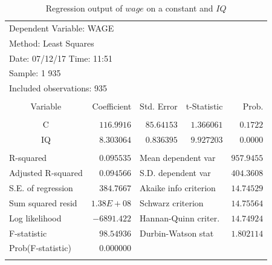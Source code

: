 \documentclass[12pt]{report}
\begin{document}
\begin{table}[H]
	\centering
	\begin{tabular}{lrrrr}
		\multicolumn{3}{l}{Dependent Variable: WAGE}&\multicolumn{1}{c}{}&\multicolumn{1}{c}{}\\
		\multicolumn{3}{l}{Method: Least Squares}&\multicolumn{1}{c}{}&\multicolumn{1}{c}{}\\
		\multicolumn{3}{l}{Date: 07/12/17   Time: 11:51}&\multicolumn{1}{c}{}&\multicolumn{1}{c}{}\\
		\multicolumn{2}{l}{Sample: 1 935}&\multicolumn{1}{c}{}&\multicolumn{1}{c}{}&\multicolumn{1}{c}{}\\
		\multicolumn{3}{l}{Included observations: 935}&\multicolumn{1}{c}{}&\multicolumn{1}{c}{}\\
		[4.5pt] \hline \\ [-4.5pt]
		\multicolumn{1}{c}{Variable}&\multicolumn{1}{r}{Coefficient}&\multicolumn{1}{r}{Std. Error}&\multicolumn{1}{r}{t-Statistic}&\multicolumn{1}{r}{Prob.}\\
		[4.5pt] \hline \\ [-4.5pt]
		\multicolumn{1}{c}{C}&\multicolumn{1}{r}{$116.9916$}&\multicolumn{1}{r}{$85.64153$}&\multicolumn{1}{r}{$1.366061$}&\multicolumn{1}{r}{$0.1722$}\\
		\multicolumn{1}{c}{IQ}&\multicolumn{1}{r}{$8.303064$}&\multicolumn{1}{r}{$0.836395$}&\multicolumn{1}{r}{$9.927203$}&\multicolumn{1}{r}{$0.0000$}\\
		[4.5pt] \hline \\ [-4.5pt]
		\multicolumn{1}{l}{R-squared}&\multicolumn{1}{r}{$0.095535$}&\multicolumn{2}{l}{Mean dependent var}&\multicolumn{1}{r}{$957.9455$}\\
		\multicolumn{1}{l}{Adjusted R-squared}&\multicolumn{1}{r}{$0.094566$}&\multicolumn{2}{l}{S.D. dependent var}&\multicolumn{1}{r}{$404.3608$}\\
		\multicolumn{1}{l}{S.E. of regression}&\multicolumn{1}{r}{$384.7667$}&\multicolumn{2}{l}{Akaike info criterion}&\multicolumn{1}{r}{$14.74529$}\\
		\multicolumn{1}{l}{Sum squared resid}&\multicolumn{1}{r}{$1.38E+08$}&\multicolumn{2}{l}{Schwarz criterion}&\multicolumn{1}{r}{$14.75564$}\\
		\multicolumn{1}{l}{Log likelihood}&\multicolumn{1}{r}{$-6891.422$}&\multicolumn{2}{l}{Hannan-Quinn criter.}&\multicolumn{1}{r}{$14.74924$}\\
		\multicolumn{1}{l}{F-statistic}&\multicolumn{1}{r}{$98.54936$}&\multicolumn{2}{l}{Durbin-Watson stat}&\multicolumn{1}{r}{$1.802114$}\\
		\multicolumn{1}{l}{Prob(F-statistic)}&\multicolumn{1}{r}{$0.000000$}&\multicolumn{1}{c}{}&\multicolumn{1}{c}{}&\multicolumn{1}{c}{}\\
		[4.5pt] \hline \\ [-4.5pt]
	\end{tabular}
	\caption{Regression output of $wage$ on a constant and $IQ$}
	\label{tbl:regout1}
\end{table}
\end{document}
